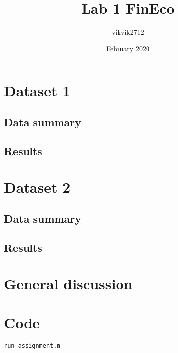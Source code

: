 \documentclass[a4paper,12pt,onecolumn]{article}
\begin{document}
\title{Lab 1 FinEco}
\author{vikvik2712 }
\date{February 2020}


\section{Dataset 1}
\subsection{Data summary}
\subsection{Results}


\section{Dataset 2}
\subsection{Data summary}
\subsection{Results}


\section{General discussion}

\section{Code}
\texttt{run\_assignment.m}
\end{document}
